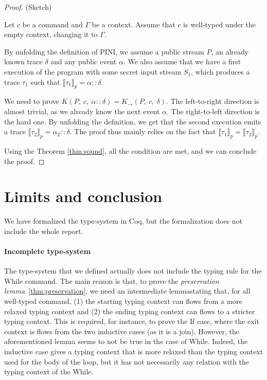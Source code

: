 \documentclass[10pt]{article}
\newcommand{\ctx}{\Gamma}
\newcommand{\pproj}[1]{\llbracket #1 \rrbracket_{p}}
\begin{document}
\begin{proof} (Sketch)

  Let $c$ be a command and $\ctx$ be a context. Assume that $c$ is well-typed under the empty
  context, changing it to $\ctx$.

  By unfolding the definition of PINI, we assume a public stream $P$, an already known trace
  $\delta$ and any public event $\alpha$. We also assume that we have a first execution of the
  program with some secret input stream $S_{1}$, which produces a trace $\tau_{1}$ such that
  $\pproj{\tau_{1}} = \alpha::\delta$.

  We need to prove \(K(P,~c,~\alpha::\delta) = K_{\rightarrow}(P,~c,~\delta) \).
  The left-to-right direction is almost trivial, as we already know the next event $\alpha$.
  The right-to-left direction is the hard one. By unfolding the definition, we get that
  the second execution emits a trace $ \pproj{\tau_{2}} = \alpha_{2} :: \delta$.
  The proof thus mainly relies on the fact that $\pproj{\tau_{1}}= \pproj{\tau_{2}}$.

  Using the Theorem \ref{thm:sound}, all the condition are met, and we can conclude the proof.

\end{proof}


\section{Limits and conclusion}%
\label{sec:conclusion}

We have formalized the type-system in Coq, but the formalization does not include the whole report.

\paragraph{Incomplete type-system}
The type-system that we defined actually does not include the typing rule for the While
command.
The main reason is that, to prove the \emph{preservation lemma}~\ref{thm:preservation}, we need an
intermediate lemma\footnotemark[2] stating that, for all well-typed command, (1) the starting typing
context can flows from a more relaxed typing context and (2) the ending typing context can flows to
a stricter typing context. This is required, for instance, to prove the If case, where the exit
context is flows from the two inductive cases (as it is a join).
However, the aforementioned lemma seems to not be true in the case of While. Indeed, the inductive
case gives a typing context that is more relaxed than the typing context used for the body of the
loop, but it has not necessarily any relation with the typing context of the While.
\end{document}

